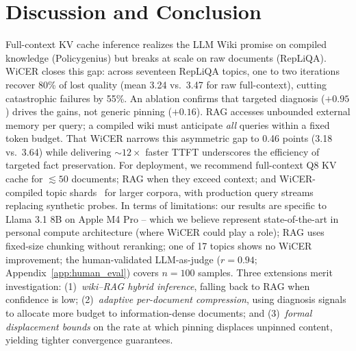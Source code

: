 \documentclass{article}
\begin{document}
\section{Discussion and Conclusion}
\label{sec:discussion}
\label{sec:future}

Full-context KV cache inference realizes the LLM Wiki promise on compiled knowledge (Policygenius) but breaks at scale on raw documents (RepLiQA). WiCER closes this gap: across seventeen RepLiQA topics, one to two iterations recover 80\% of lost quality (mean 3.24 vs.\ 3.47 for raw full-context), cutting catastrophic failures by 55\%. An ablation confirms that targeted diagnosis ($+0.95$) drives the gains, not generic pinning ($+0.16$). RAG accesses unbounded external memory per query; a compiled wiki must anticipate \emph{all} queries within a fixed token budget. That WiCER narrows this asymmetric gap to 0.46 points (3.18 vs.\ 3.64) while delivering ${\sim}12\times$ faster TTFT underscores the efficiency of targeted fact preservation. For deployment, we recommend full-context Q8 KV cache for ${\lesssim}50$ documents; RAG when they exceed context; and WiCER-compiled topic shards~\cite{zheng2024sglang,qin2025mooncake,yao2025cacheblend} for larger corpora, with production query streams replacing synthetic probes. In terms of limitations: our results are specific to Llama 3.1 8B on Apple M4 Pro -- which we believe represent state-of-the-art in personal compute architecture (where WiCER could play a role); RAG uses fixed-size chunking without reranking; one of 17 topics shows no WiCER improvement; the human-validated LLM-as-judge ($r = 0.94$; Appendix~\ref{app:human_eval}) covers $n=100$ samples. Three extensions merit investigation: (1)~\emph{wiki--RAG hybrid inference}, falling back to RAG when confidence is low; (2)~\emph{adaptive per-document compression}, using diagnosis signals to allocate more budget to information-dense documents; and (3)~\emph{formal displacement bounds} on the rate at which pinning displaces unpinned content, yielding tighter convergence guarantees.






\end{document}
